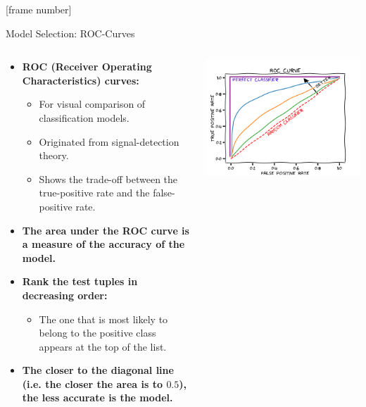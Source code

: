 \documentclass[aspectratio=169,t,table]{beamer}
\begin{document}
  {
    [frame number]
    \begin{frame}{Model Selection: ROC-Curves}
      \begin{columns}
        \begin{column}{0.6\textwidth}
          \begin{itemize}
            \item \textbf{ROC (Receiver Operating Characteristics) curves:}
            \begin{itemize}
              \item For visual comparison of classification models.
              \item Originated from signal-detection theory.
              \item Shows the trade-off between the true-positive rate and the false-positive rate.
            \end{itemize}
            \item \textbf{The area under the ROC curve is a {\color{airforceblue}measure of the accuracy} of the model.}
            \item \textbf{{\color{airforceblue}Rank the test tuples} in decreasing order:}
            \begin{itemize}
              \item The one that is most likely to belong to the positive class appears at the top of the list.
            \end{itemize}
            \item \textbf{The closer to the diagonal line (i.e. the closer the area is to $0.5$), the less accurate is the model.}
          \end{itemize}
        \end{column}
        \begin{column}{0.4\textwidth}
          \vspace{-1cm}
          \centering
          \includegraphics[width=\textwidth]{img/roc-curve.png}

\end{column}
\end{columns}
\end{frame}}
\end{document}
